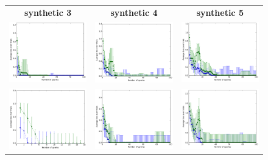 \documentclass{article}
\renewcommand\[{\begin{equation}}
\renewcommand\]{\end{equation}}
\begin{document}
\begin{figure}[b]
    \centering
    \begin{tabular}{ccc}
        {\bf synthetic 3} & {\bf synthetic 4} & {\bf synthetic 5}
        \\
        \includegraphics[width=12em]{figures/synthetic_3_uniform} &
        \includegraphics[width=12em]{figures/synthetic_4_uniform} &
        \includegraphics[width=12em]{figures/synthetic_5_uniform}
        \\
        \includegraphics[width=12em]{figures/synthetic_3_uniform_sparse} &
        \includegraphics[width=12em]{figures/synthetic_4_uniform_sparse} &
        \includegraphics[width=12em]{figures/synthetic_5_uniform_sparse}

\end{tabular}
\end{figure}
\end{document}
